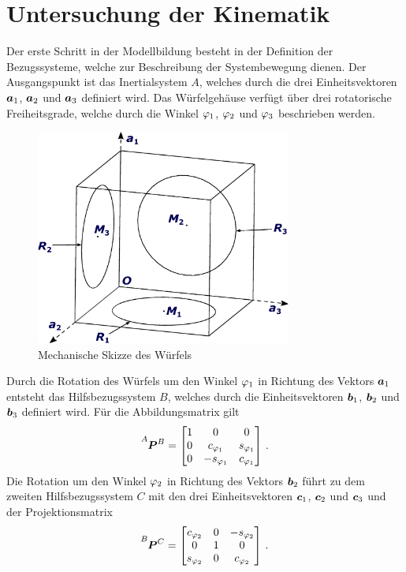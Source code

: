 \section{Untersuchung der Kinematik}
Der erste Schritt in der Modellbildung besteht in der Definition der Bezugssysteme, welche zur Beschreibung der Systembewegung dienen. Der Ausgangspunkt ist das Inertialsystem $A$, welches durch die drei Einheitsvektoren $\boldsymbol{a}_{\text{1}}$, $\boldsymbol{a}_{\text{2}}$ und $\boldsymbol{a}_{\text{3}}$ definiert wird. Das Würfelgehäuse verfügt über drei rotatorische Freiheitsgrade, welche durch die Winkel $\varphi_{\text{1}}$, $\varphi_{\text{2}}$ und $\varphi_{\text{3}}$ beschrieben werden. 
\begin{figure}[!h]
\centering
\includegraphics[width=0.75\textwidth]{img/tm_corner_drawing.eps}
\caption{Mechanische Skizze des Würfels}
\end{figure}
Durch die Rotation des Würfels um den Winkel $\varphi_{\text{1}}$ in Richtung des Vektors $\boldsymbol{a}_{\text{1}}$ entsteht das Hilfsbezugssystem $B$, welches durch die Einheitsvektoren $\boldsymbol{b}_{\text{1}}$, $\boldsymbol{b}_{\text{2}}$ und $\boldsymbol{b}_{\text{3}}$ definiert wird. Für die Abbildungsmatrix gilt
\begin{equation}
\pMat{A}{B} = \begin{bmatrix}
1 & 0 & 0 \\ 0 & c_{\varphi\idx1} & s_{\varphi\idx1} \\ 0 & -s_{\varphi\idx1} & c_{\varphi\idx1}
\end{bmatrix} \,.
\end{equation}
Die Rotation um den Winkel $\varphi_{\text{2}}$ in Richtung des Vektors $\boldsymbol{b}_{\text{2}}$ führt zu dem zweiten Hilfsbezugssystem $C$ mit den drei Einheitsvektoren $\boldsymbol{c}_{\text{1}}$, $\boldsymbol{c}_{\text{2}}$ und $\boldsymbol{c}_{\text{3}}$ und der Projektionsmatrix
\begin{equation}
\pMat{B}{C} = \begin{bmatrix}
c_{\varphi\idx2} & 0 & -s_{\varphi\idx2} \\
0 & 1 & 0 \\
 s_{\varphi\idx2} & 0 & c_{\varphi\idx2}
\end{bmatrix} \,.
\end{equation}
